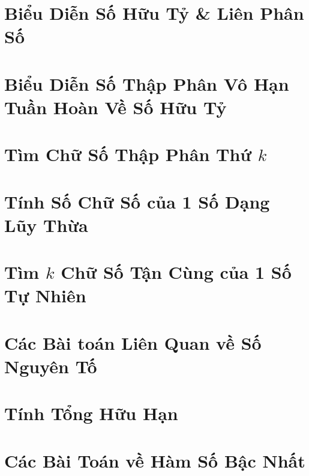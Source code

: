 \documentclass{article}
\begin{document}
\section{Biểu Diễn Số Hữu Tỷ \& Liên Phân Số}


\section{Biểu Diễn Số Thập Phân Vô Hạn Tuần Hoàn Về Số Hữu Tỷ}


\section{Tìm Chữ Số Thập Phân Thứ $k$}


\section{Tính Số Chữ Số của 1 Số Dạng Lũy Thừa}


\section{Tìm $k$ Chữ Số Tận Cùng của 1 Số Tự Nhiên}


\section{Các Bài toán Liên Quan về Số Nguyên Tố}


\section{Tính Tổng Hữu Hạn}


\section{Các Bài Toán về Hàm Số Bậc Nhất}
\end{document}
